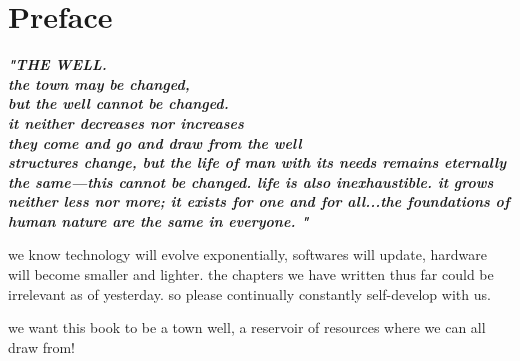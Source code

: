 
\chapter{Preface}
\begin{fullwidth}

{\itshape\bfseries "THE WELL.
\\
the town may be changed,
\\
but the well cannot be changed.
\\
it neither decreases nor increases
\\
they come and go and draw from the well
\\
structures change, but the life of man with its needs remains eternally the same—this cannot be changed. life is also inexhaustible. it grows neither less nor more; it exists for one and for all...the foundations of human nature are the same in everyone. "
}

we know technology will evolve exponentially, softwares will update, hardware will become smaller and lighter. the chapters we have written thus far could be irrelevant as of yesterday. so please continually constantly self-develop with us. 

we want this book to be a town well, a reservoir of resources where we can all draw from!

\clearpage
\end{fullwidth}
